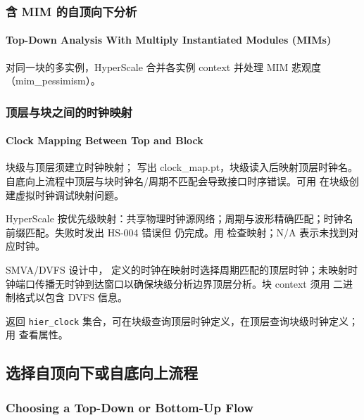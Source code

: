 \subsubsection{含 MIM 的自顶向下分析}
\paragraph*{Top-Down Analysis With Multiply Instantiated Modules (MIMs)}

对同一块的多实例，HyperScale 合并各实例 context 并处理 MIM 悲观度（mim_pessimism）。


\subsubsection{顶层与块之间的时钟映射}
\paragraph*{Clock Mapping Between Top and Block}

块级与顶层须建立时钟映射； 写出 clock\_map.pt，块级读入后映射顶层时钟名。自底向上流程中顶层与块时钟名/周期不匹配会导致接口时序错误。可用  在块级创建虚拟时钟调试映射问题。

HyperScale 按优先级映射：共享物理时钟源网络；周期与波形精确匹配；时钟名前缀匹配。失败时发出 HS-004 错误但  仍完成。用  检查映射；N/A 表示未找到对应时钟。

SMVA/DVFS 设计中， 定义的时钟在映射时选择周期匹配的顶层时钟；未映射时钟端口传播无时钟到达窗口以确保块级分析边界顶层分析。块 context 须用  二进制格式以包含 DVFS 信息。

 返回 \texttt{hier\_clock} 集合，可在块级查询顶层时钟定义，在顶层查询块级时钟定义；用  查看属性。

\subsection{选择自顶向下或自底向上流程}
\subsubsection*{Choosing a Top-Down or Bottom-Up Flow}

